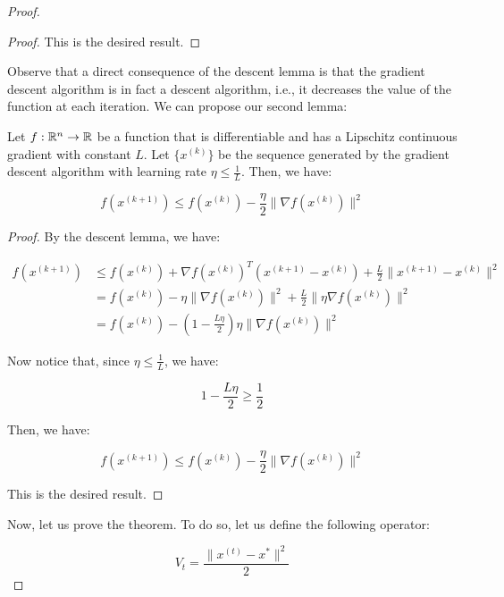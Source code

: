 \begin{proof}
\begin{proof}
        This is the desired result.

    \end{proof}


    Observe that a direct consequence of the descent lemma is that the gradient descent algorithm
    is in fact a descent algorithm, i.e., it decreases the value of the function at each iteration.
    We can propose our second lemma:

    \begin{lemma}
        Let $f: \mathbb{R}^n \rightarrow \mathbb{R}$ be a function that is differentiable and has a Lipschitz
        continuous gradient with constant $L$. Let $\{ x^{(k)} \}$ be the sequence generated by the
        gradient descent algorithm with learning rate $\eta \leq \frac{1}{L}$. Then, we have:

        \begin{equation}
            f(x^{(k+1)}) \leq f(x^{(k)}) - \frac{\eta}{2} \| \nabla f(x^{(k)}) \|^2
        \end{equation}
    \end{lemma}

    \begin{proof}
        By the descent lemma, we have:

        \begin{align*}
            f(x^{(k+1)}) &\leq f(x^{(k)}) + \nabla f(x^{(k)})^T (x^{(k+1)} - x^{(k)}) + \frac{L}{2} \| x^{(k+1)} - x^{(k)} \|^2\\
            &= f(x^{(k)}) - \eta \| \nabla f(x^{(k)}) \|^2 + \frac{L}{2} \| \eta \nabla f(x^{(k)}) \|^2\\
            &= f(x^{(k)}) - \left(1 - \frac{L \eta}{2} \right) \eta  \| \nabla f(x^{(k)}) \|^2
        \end{align*}

        Now notice that, since $\eta \leq \frac{1}{L}$, we have:

        $$1 - \frac{L \eta}{2} \geq \frac{1}{2}$$

        Then, we have:

        $$f(x^{(k+1)}) \leq f(x^{(k)}) - \frac{\eta}{2} \| \nabla f(x^{(k)}) \|^2$$

        This is the desired result.
    \end{proof}

    Now, let us prove the theorem. To do so, let us define the following operator:

    $$V_{t} = \frac{\|x^{(t)} - x^*\|^2}{2}$$


\end{proof}
